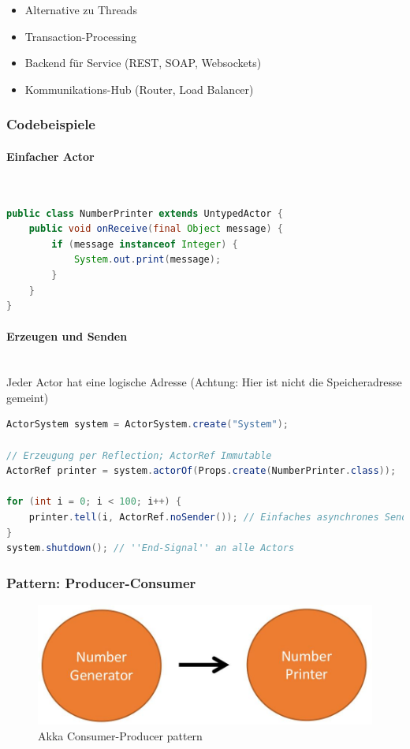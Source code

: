 \begin{itemize}
	\item Alternative zu Threads
	\item Transaction-Processing
	\item Backend für Service (REST, SOAP, Websockets)
	\item Kommunikations-Hub (Router, Load Balancer)
\end{itemize}

\subsubsection{Codebeispiele}

\paragraph{Einfacher Actor} \hfill \\

\begin{lstlisting}[language=java]
public class NumberPrinter extends UntypedActor {
	public void onReceive(final Object message) {
		if (message instanceof Integer) {
			System.out.print(message);
		}
	}
}
\end{lstlisting}

\paragraph{Erzeugen und Senden} \hfill \\
Jeder Actor hat eine logische Adresse (Achtung: Hier ist nicht die Speicheradresse gemeint)

\begin{lstlisting}[language=java]
ActorSystem system = ActorSystem.create("System");

// Erzeugung per Reflection; ActorRef Immutable
ActorRef printer = system.actorOf(Props.create(NumberPrinter.class));

for (int i = 0; i < 100; i++) {
	printer.tell(i, ActorRef.noSender()); // Einfaches asynchrones Senden
}
system.shutdown(); // ''End-Signal'' an alle Actors
\end{lstlisting}

\subsubsection{Pattern: Producer-Consumer}

\begin{figure}[h]
	\centering
	\includegraphics[width=0.5\linewidth]{img/akka_consumer_producer}
	\caption{Akka Consumer-Producer pattern}
	\label{fig:akkaconsumerproducer}
\end{figure}


